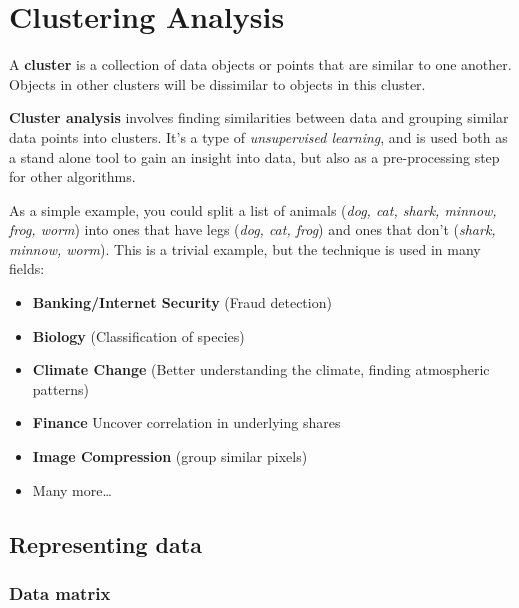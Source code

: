\section{Clustering Analysis}

A \textbf{cluster} is a collection of data objects or points that are similar to
one another. Objects in other clusters will be dissimilar to objects in this
cluster.


\textbf{Cluster analysis} involves finding similarities between data and
grouping similar data points into clusters. It's a type of \textit{unsupervised
learning}, and is used both as a stand alone tool to gain an insight into data,
but also as a pre-processing step for other algorithms.

As a simple example, you could split a list of animals (\textit{dog, cat, shark,
minnow, frog, worm}) into ones that have legs (\textit{dog, cat, frog}) and ones
that don't (\textit{shark, minnow, worm}). This is a trivial example, but the
technique is used in many fields:

\begin{mymulticols}
  \begin{itemize}
    \item \textbf{Banking/Internet Security} (Fraud detection)
    \item \textbf{Biology} (Classification of species)
    \item \textbf{Climate Change} (Better understanding the climate, finding
      atmospheric patterns)
    \item \textbf{Finance} Uncover correlation in underlying shares
    \item \textbf{Image Compression} (group similar pixels)
    \item Many more\dots
  \end{itemize}
\end{mymulticols}

\subsection{Representing data}

\subsubsection{Data matrix}

